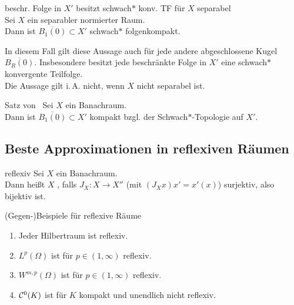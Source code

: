 \linie

\begin{Satz}{beschr. Folge in $X'$ besitzt schwach$\ast$ konv. TF für $X$ separabel}\\
    Sei $X$ ein separabler normierter Raum.\\
    Dann ist $\overline{B_1(0)} \subset X'$ schwach$\ast$ folgenkompakt.
\end{Satz}

\begin{Bem}
    In diesem Fall gilt diese Aussage auch für jede andere abgeschlossene Kugel
    $\overline{B_R(0)}$.
    Insbesondere besitzt jede beschränkte Folge in $X'$ eine schwach$\ast$ konvergente Teilfolge.\\
    Die Aussage gilt i.\,A. nicht, wenn $X$ nicht separabel ist.
\end{Bem}

\begin{Satz}{Satz von \scshape\,\!}
    Sei $X$ ein Banachraum.\\
    Dann ist $\overline{B_1(0)} \subset X'$ kompakt bzgl. der Schwach$\ast$-Topologie auf $X'$.
\end{Satz}

\pagebreak

\subsection{%
    Beste Approximationen in reflexiven Räumen%
}

\begin{Def}{reflexiv}
    Sei $X$ ein Banachraum.\\
    Dann heißt $X$ , falls $J_X\colon X \rightarrow X''$
    (mit $(J_X x)x' = x'(x)$) surjektiv, also bijektiv ist.
\end{Def}

\begin{Satz}{(Gegen-)Beispiele für reflexive Räume}
    \begin{enumerate}
        \item
        Jeder Hilbertraum ist reflexiv.
        
        \item
        $L^p(\Omega)$ ist für $p \in (1, \infty)$ reflexiv.
        
        \item
        $W^{m,p}(\Omega)$ ist für $p \in (1, \infty)$ reflexiv.
        
        \item
        $\mathcal{C}^0(K)$ ist für $K$ kompakt und unendlich nicht reflexiv.
    \end{enumerate}
\end{Satz}


